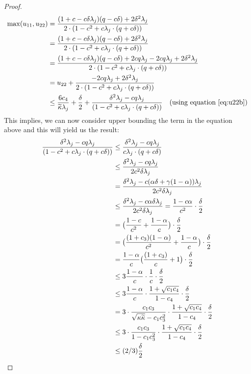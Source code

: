 \begin{proof}
\begin{align*}
\max(u_{11},u_{22}) &= \frac{(1+c-c\delta\lambda_j)(q -c\delta)+2\delta^2\lambda_j}{2\cdot(1-c^2+c\lambda_j\cdot(q +c\delta))}\\
&=\frac{(1+c-c\delta\lambda_j)(q -c\delta)+2\delta^2\lambda_j}{2\cdot(1-c^2+c\lambda_j\cdot(q +c\delta))}\\
&=\frac{(1+c-c\delta\lambda_j)(q -c\delta)+2cq\lambda_j-2cq\lambda_j+2\delta^2\lambda_j}{2\cdot(1-c^2+c\lambda_j\cdot(q +c\delta))}\\
&=u_{22}+\frac{-2cq\lambda_j+2\delta^2\lambda_j}{2\cdot(1-c^2+c\lambda_j\cdot(q +c\delta))}\\
&\leq \frac{6c_4}{\widetilde{\kappa}\lambda_j} + \frac{\delta}{2} + \frac{\delta^2\lambda_j-cq\lambda_j}{(1-c^2+c\lambda_j\cdot(q +c\delta))}\quad\text{(using equation~\ref{eq:u22b})}
\end{align*}
This implies, we can now consider upper bounding the term in the equation above and this will yield us the result:
\begin{align*}
\frac{\delta^2\lambda_j-c\g\lambda_j}{(1-c^2+c\lambda_j\cdot(\g +c\delta))}&\leq\frac{\delta^2\lambda_j-c\g\lambda_j}{c\lambda_j\cdot(\g +c\delta)}\\
&\leq\frac{\delta^2\lambda_j-c\g\lambda_j}{2c^2\delta\lambda_j}\\
&=\frac{\delta^2\lambda_j-c(\alpha\delta+\gamma(1-\alpha))\lambda_j}{2c^2\delta\lambda_j}\\
&\leq\frac{\delta^2\lambda_j-c\alpha\delta\lambda_j}{2c^2\delta\lambda_j}=\frac{1-c\alpha}{c^2}\cdot\frac{\delta}{2}\\
&=\big(\frac{1-c}{c^2}+\frac{1-\alpha}{c}\big)\cdot\frac{\delta}{2}\\
&=\big(\frac{(1+\cthree)(1-\alpha)}{c^2}+\frac{1-\alpha}{c}\big)\cdot\frac{\delta}{2}\\
&=\frac{1-\alpha}{c}\big(\frac{(1+\cthree)}{c}+1\big)\cdot\frac{\delta}{2}\\
&\leq3\frac{1-\alpha}{c}\cdot\frac{1}{c}\cdot\frac{\delta}{2}\\
&\leq3\frac{1-\alpha}{c}\cdot\frac{1+\sqrt{\cone\cfour}}{1-\cfour}\cdot\frac{\delta}{2}\\
&=3\cdot\frac{\cone\cthree}{\sqrt{\cnH\cnS}-\cone\cthree^2}\cdot\frac{1+\sqrt{\cone\cfour}}{1-\cfour}\cdot\frac{\delta}{2}\\
&\leq3\cdot\frac{\cone\cthree}{1-\cone\cthree^2}\cdot\frac{1+\sqrt{\cone\cfour}}{1-\cfour}\cdot\frac{\delta}{2}\\
&\leq (2/3) \frac{\delta}{2}

\end{align*}
\end{proof}
